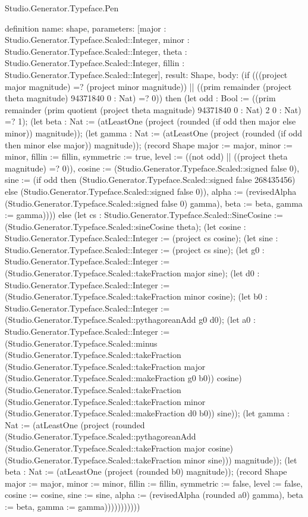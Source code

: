 \begin{lexlean}{Studio.Generator.Typeface.Pen}
\begin{semanticmodule}
definition{
  name: shape,
  parameters: [major : Studio.Generator.Typeface.Scaled::Integer, minor : Studio.Generator.Typeface.Scaled::Integer, theta : Studio.Generator.Typeface.Scaled::Integer, fillin : Studio.Generator.Typeface.Scaled::Integer],
  result: Shape,
  body: (if (((project major magnitude) =? (project minor magnitude)) || ((prim remainder (project theta magnitude) 94371840 0 : Nat) =? 0)) then (let odd : Bool := ((prim remainder (prim quotient (project theta magnitude) 94371840 0 : Nat) 2 0 : Nat) =? 1); (let beta : Nat := (atLeastOne (project (rounded (if odd then major else minor)) magnitude)); (let gamma : Nat := (atLeastOne (project (rounded (if odd then minor else major)) magnitude)); (record Shape {major := major, minor := minor, fillin := fillin, symmetric := true, level := ((not odd) || ((project theta magnitude) =? 0)), cosine := (Studio.Generator.Typeface.Scaled::signed false 0), sine := (if odd then (Studio.Generator.Typeface.Scaled::signed false 268435456) else (Studio.Generator.Typeface.Scaled::signed false 0)), alpha := (revisedAlpha (Studio.Generator.Typeface.Scaled::signed false 0) gamma), beta := beta, gamma := gamma})))) else (let cs : Studio.Generator.Typeface.Scaled::SineCosine := (Studio.Generator.Typeface.Scaled::sineCosine theta); (let cosine : Studio.Generator.Typeface.Scaled::Integer := (project cs cosine); (let sine : Studio.Generator.Typeface.Scaled::Integer := (project cs sine); (let g0 : Studio.Generator.Typeface.Scaled::Integer := (Studio.Generator.Typeface.Scaled::takeFraction major sine); (let d0 : Studio.Generator.Typeface.Scaled::Integer := (Studio.Generator.Typeface.Scaled::takeFraction minor cosine); (let b0 : Studio.Generator.Typeface.Scaled::Integer := (Studio.Generator.Typeface.Scaled::pythagoreanAdd g0 d0); (let a0 : Studio.Generator.Typeface.Scaled::Integer := (Studio.Generator.Typeface.Scaled::minus (Studio.Generator.Typeface.Scaled::takeFraction (Studio.Generator.Typeface.Scaled::takeFraction major (Studio.Generator.Typeface.Scaled::makeFraction g0 b0)) cosine) (Studio.Generator.Typeface.Scaled::takeFraction (Studio.Generator.Typeface.Scaled::takeFraction minor (Studio.Generator.Typeface.Scaled::makeFraction d0 b0)) sine)); (let gamma : Nat := (atLeastOne (project (rounded (Studio.Generator.Typeface.Scaled::pythagoreanAdd (Studio.Generator.Typeface.Scaled::takeFraction major cosine) (Studio.Generator.Typeface.Scaled::takeFraction minor sine))) magnitude)); (let beta : Nat := (atLeastOne (project (rounded b0) magnitude)); (record Shape {major := major, minor := minor, fillin := fillin, symmetric := false, level := false, cosine := cosine, sine := sine, alpha := (revisedAlpha (rounded a0) gamma), beta := beta, gamma := gamma})))))))))))
}


\end{semanticmodule}
\end{lexlean}
